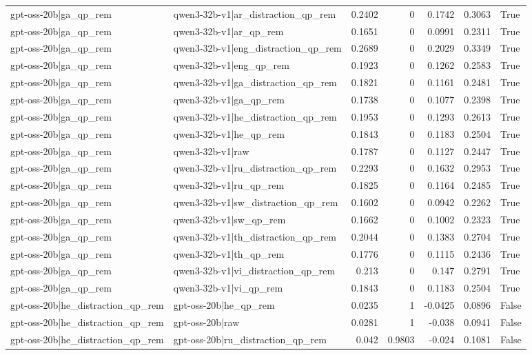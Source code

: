 \begin{table}
\begin{tabular}{l l r r r r l}
gpt-oss-20b|ga_qp_rem & qwen3-32b-v1|ar_distraction_qp_rem & 0.2402 & 0 & 0.1742 & 0.3063 & True \\
gpt-oss-20b|ga_qp_rem & qwen3-32b-v1|ar_qp_rem & 0.1651 & 0 & 0.0991 & 0.2311 & True \\
gpt-oss-20b|ga_qp_rem & qwen3-32b-v1|eng_distraction_qp_rem & 0.2689 & 0 & 0.2029 & 0.3349 & True \\
gpt-oss-20b|ga_qp_rem & qwen3-32b-v1|eng_qp_rem & 0.1923 & 0 & 0.1262 & 0.2583 & True \\
gpt-oss-20b|ga_qp_rem & qwen3-32b-v1|ga_distraction_qp_rem & 0.1821 & 0 & 0.1161 & 0.2481 & True \\
gpt-oss-20b|ga_qp_rem & qwen3-32b-v1|ga_qp_rem & 0.1738 & 0 & 0.1077 & 0.2398 & True \\
gpt-oss-20b|ga_qp_rem & qwen3-32b-v1|he_distraction_qp_rem & 0.1953 & 0 & 0.1293 & 0.2613 & True \\
gpt-oss-20b|ga_qp_rem & qwen3-32b-v1|he_qp_rem & 0.1843 & 0 & 0.1183 & 0.2504 & True \\
gpt-oss-20b|ga_qp_rem & qwen3-32b-v1|raw & 0.1787 & 0 & 0.1127 & 0.2447 & True \\
gpt-oss-20b|ga_qp_rem & qwen3-32b-v1|ru_distraction_qp_rem & 0.2293 & 0 & 0.1632 & 0.2953 & True \\
gpt-oss-20b|ga_qp_rem & qwen3-32b-v1|ru_qp_rem & 0.1825 & 0 & 0.1164 & 0.2485 & True \\
gpt-oss-20b|ga_qp_rem & qwen3-32b-v1|sw_distraction_qp_rem & 0.1602 & 0 & 0.0942 & 0.2262 & True \\
gpt-oss-20b|ga_qp_rem & qwen3-32b-v1|sw_qp_rem & 0.1662 & 0 & 0.1002 & 0.2323 & True \\
gpt-oss-20b|ga_qp_rem & qwen3-32b-v1|th_distraction_qp_rem & 0.2044 & 0 & 0.1383 & 0.2704 & True \\
gpt-oss-20b|ga_qp_rem & qwen3-32b-v1|th_qp_rem & 0.1776 & 0 & 0.1115 & 0.2436 & True \\
gpt-oss-20b|ga_qp_rem & qwen3-32b-v1|vi_distraction_qp_rem & 0.213 & 0 & 0.147 & 0.2791 & True \\
gpt-oss-20b|ga_qp_rem & qwen3-32b-v1|vi_qp_rem & 0.1843 & 0 & 0.1183 & 0.2504 & True \\
gpt-oss-20b|he_distraction_qp_rem & gpt-oss-20b|he_qp_rem & 0.0235 & 1 & -0.0425 & 0.0896 & False \\
gpt-oss-20b|he_distraction_qp_rem & gpt-oss-20b|raw & 0.0281 & 1 & -0.038 & 0.0941 & False \\
gpt-oss-20b|he_distraction_qp_rem & gpt-oss-20b|ru_distraction_qp_rem & 0.042 & 0.9803 & -0.024 & 0.1081 & False \\

\end{tabular}
\end{table}
